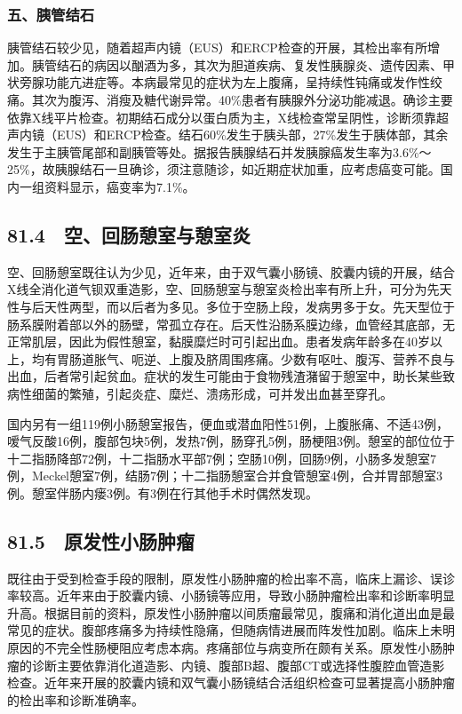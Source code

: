 \subsubsection{五、胰管结石}

胰管结石较少见，随着超声内镜（EUS）和ERCP检查的开展，其检出率有所增加。胰管结石的病因以酗酒为多，其次为胆道疾病、复发性胰腺炎、遗传因素、甲状旁腺功能亢进症等。本病最常见的症状为左上腹痛，呈持续性钝痛或发作性绞痛。其次为腹泻、消瘦及糖代谢异常。40\%患者有胰腺外分泌功能减退。确诊主要依靠X线平片检查。初期结石成分以蛋白质为主，X线检查常呈阴性，诊断须靠超声内镜（EUS）和ERCP检查。结石60\%发生于胰头部，27\%发生于胰体部，其余发生于主胰管尾部和副胰管等处。据报告胰腺结石并发胰腺癌发生率为3.6\%～25\%，故胰腺结石一旦确诊，须注意随诊，如近期症状加重，应考虑癌变可能。国内一组资料显示，癌变率为7.1\%。

\subsection{81.4　空、回肠憩室与憩室炎}

空、回肠憩室既往认为少见，近年来，由于双气囊小肠镜、胶囊内镜的开展，结合X线全消化道气钡双重造影，空、回肠憩室与憩室炎检出率有所上升，可分为先天性与后天性两型，而以后者为多见。多位于空肠上段，发病男多于女。先天型位于肠系膜附着部以外的肠壁，常孤立存在。后天性沿肠系膜边缘，血管经其底部，无正常肌层，因此为假性憩室，黏膜糜烂时可引起出血。患者发病年龄多在40岁以上，均有胃肠道胀气、呃逆、上腹及脐周围疼痛。少数有呕吐、腹泻、营养不良与出血，后者常引起贫血。症状的发生可能由于食物残渣潴留于憩室中，助长某些致病性细菌的繁殖，引起炎症、糜烂、溃疡形成，可并发出血甚至穿孔。

国内另有一组119例小肠憩室报告，便血或潜血阳性51例，上腹胀痛、不适43例，嗳气反酸16例，腹部包块5例，发热7例，肠穿孔5例，肠梗阻3例。憩室的部位位于十二指肠降部72例，十二指肠水平部7例；空肠10例，回肠9例，小肠多发憩室7例，Meckel憩室7例，结肠7例；十二指肠憩室合并食管憩室4例，合并胃部憩室3例。憩室伴肠内瘘3例。有3例在行其他手术时偶然发现。

\subsection{81.5　原发性小肠肿瘤}

既往由于受到检查手段的限制，原发性小肠肿瘤的检出率不高，临床上漏诊、误诊率较高。近年来由于胶囊内镜、小肠镜等应用，导致小肠肿瘤检出率和诊断率明显升高。根据目前的资料，原发性小肠肿瘤以间质瘤最常见，腹痛和消化道出血是最常见的症状。腹部疼痛多为持续性隐痛，但随病情进展而阵发性加剧。临床上未明原因的不完全性肠梗阻应考虑本病。疼痛部位与病变所在颇有关系。原发性小肠肿瘤的诊断主要依靠消化道造影、内镜、腹部B超、腹部CT或选择性腹腔血管造影检查。近年来开展的胶囊内镜和双气囊小肠镜结合活组织检查可显著提高小肠肿瘤的检出率和诊断准确率。

